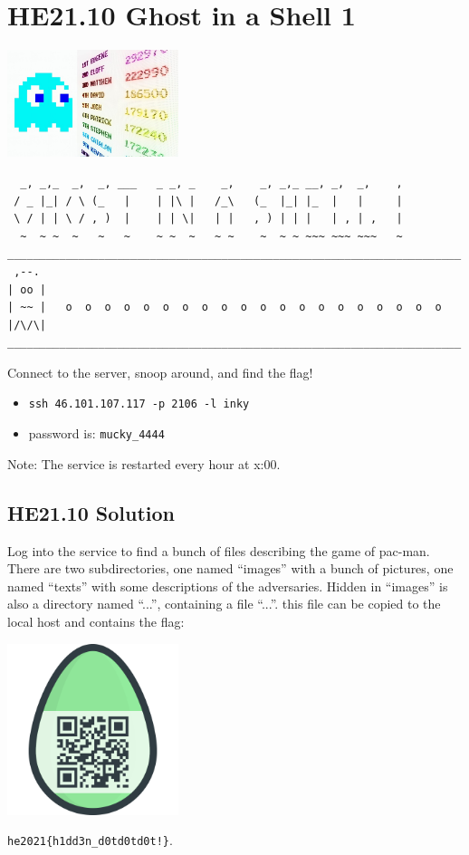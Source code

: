 \documentclass[english,a4paper,nols,noindent]{tufte-handout}
\begin{document}
\hypertarget{he21.10}{%
\section{HE21.10 Ghost in a Shell 1}\label{he21.10}}
\begin{marginfigure}
    \includegraphics[width=50mm]{images/challenge10.jpg}
\end{marginfigure}

\begin{verbatim}
  _, _,_  _,  _, ___   _ _, _    _,    _, _,_ __, _,  _,    ,  
 / _ |_| / \ (_   |    | |\ |   /_\   (_  |_| |_  |   |     |  
 \ / | | \ / , )  |    | | \|   | |   , ) | | |   | , | ,   |  
  ~  ~ ~  ~   ~   ~    ~ ~  ~   ~ ~    ~  ~ ~ ~~~ ~~~ ~~~   ~  
______________________________________________________________________  
 ,--.    
| oo |   
| ~~ |   o  o  o  o  o  o  o  o  o  o  o  o  o  o  o  o  o  o  o  o  
|/\/\|   
______________________________________________________________________  
\end{verbatim}
Connect to the server, snoop around, and find the flag!

\begin{itemize}
\item \verb+ssh 46.101.107.117 -p 2106 -l inky+
\item password is: \verb+mucky_4444+
\end{itemize}
Note: The service is restarted every hour at x:00.

\hypertarget{he21.10-solution}{%
\subsection{HE21.10 Solution}\label{he21.10-solution}}

Log into the service to find a bunch of files describing the game of
pac-man.  There are two subdirectories, one named ``images'' with a
bunch of pictures, one named ``texts'' with some descriptions of the
adversaries.  Hidden in ``images'' is also a directory named ``...'',
containing a file ``...''.  this file can be copied to the local host
and contains the flag:

\begin{marginfigure}
    \includegraphics[width=50mm]{ch10/hidden.png}
\end{marginfigure}
\verb+he2021{h1dd3n_d0td0td0t!}+.
\end{document}
